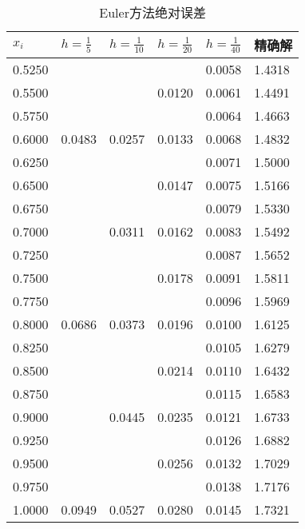 \documentclass[12pt, a4paper, oneside]{ctexart}
\begin{document}
\begin{table}[h]
\begin{minipage}[t]{0.48\textwidth}
    \begin{tabular}{@{}llllll@{}}
    \toprule
    $x_i$      & $h=\frac{1}{5}$  & $h=\frac{1}{10}$ & $h=\frac{1}{20}$ & $h=\frac{1}{40}$ & 精确解    \\ \midrule
    0.5250 &     &     &     & 0.0058 & 1.4318 \\
    0.5500 &     &     & 0.0120 & 0.0061 & 1.4491 \\
    0.5750 &     &     &     & 0.0064 & 1.4663 \\
    0.6000 & 0.0483 & 0.0257 & 0.0133 & 0.0068 & 1.4832 \\
    0.6250 &     &     &     & 0.0071 & 1.5000 \\
    0.6500 &     &     & 0.0147 & 0.0075 & 1.5166 \\
    0.6750 &     &     &     & 0.0079 & 1.5330 \\
    0.7000 &     & 0.0311 & 0.0162 & 0.0083 & 1.5492 \\
    0.7250 &     &     &     & 0.0087 & 1.5652 \\
    0.7500 &     &     & 0.0178 & 0.0091 & 1.5811 \\
    0.7750 &     &     &     & 0.0096 & 1.5969 \\
    0.8000 & 0.0686 & 0.0373 & 0.0196 & 0.0100 & 1.6125 \\
    0.8250 &     &     &     & 0.0105 & 1.6279 \\
    0.8500 &     &     & 0.0214 & 0.0110 & 1.6432 \\
    0.8750 &     &     &     & 0.0115 & 1.6583 \\
    0.9000 &     & 0.0445 & 0.0235 & 0.0121 & 1.6733 \\
    0.9250 &     &     &     & 0.0126 & 1.6882 \\
    0.9500 &     &     & 0.0256 & 0.0132 & 1.7029 \\
    0.9750 &     &     &     & 0.0138 & 1.7176 \\
    1.0000 & 0.0949 & 0.0527 & 0.0280 & 0.0145 & 1.7321 \\ \bottomrule
\end{tabular}
\end{minipage}
\caption{Euler方法绝对误差} \label{fig:euler2}
\end{table}
\end{document}
